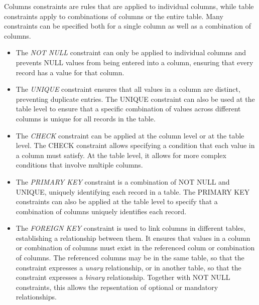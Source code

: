 Columns constraints are rules that are applied to individual columns, while table constraints apply to combinations of columns or the entire table. Many constraints can be specified both for a single column as well as a combination of columns. 

\begin{itemize}
\item The \emph{NOT NULL} constraint can only be applied to individual columns and prevents NULL values from being entered into a column, ensuring that every record has a value for that column. 
\item The \emph{UNIQUE} constraint ensures that all values in a column are distinct, preventing duplicate entries. The UNIQUE constraint can also be used at the table level to ensure that a specific combination of values across different columns is unique for all records in the table. 
\item The \emph{CHECK} constraint can be applied at the column level or at the table level. The CHECK constraint allows specifying a condition that each value in a column must satisfy. At the table level, it allows for more complex conditions that involve multiple columns. 
\item The \emph{PRIMARY KEY} constraint is a combination of NOT NULL and UNIQUE, uniquely identifying each record in a table. The PRIMARY KEY constraints can also be applied at the table level to specify that a combination of columns uniquely identifies each record. 
\item The \emph{FOREIGN KEY} constraint is used to link columns in different tables, establishing a relationship between them. It ensures that values in a column or combination of columns must exist in the referenced colum or combination of columns. The referenced columns may be in the same table, so that the constraint expresses a \emph{unary} relationship, or in another table, so that the constraint expresses a \emph{binary} relationship. Together with NOT NULL constraints, this allows the repsentation of optional or mandatory relationships. 
\end{itemize}

